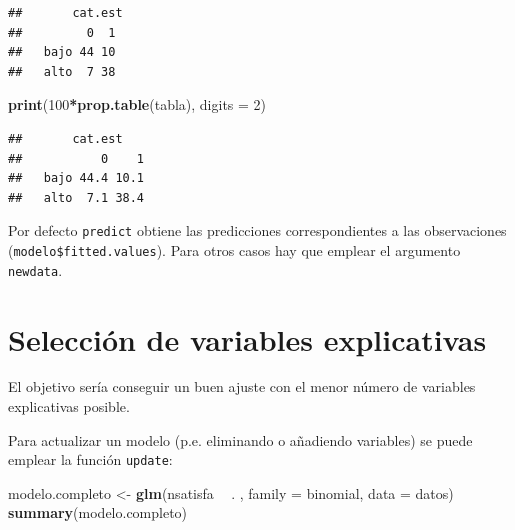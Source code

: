 \documentclass[]{book}
\newenvironment{Shaded}{\begin{snugshade}}{\end{snugshade}}
\newcommand{\KeywordTok}[1]{\textcolor[rgb]{0.13,0.29,0.53}{\textbf{#1}}}
\newcommand{\DataTypeTok}[1]{\textcolor[rgb]{0.13,0.29,0.53}{#1}}
\newcommand{\DecValTok}[1]{\textcolor[rgb]{0.00,0.00,0.81}{#1}}
\newcommand{\FloatTok}[1]{\textcolor[rgb]{0.00,0.00,0.81}{#1}}
\newcommand{\StringTok}[1]{\textcolor[rgb]{0.31,0.60,0.02}{#1}}
\newcommand{\OperatorTok}[1]{\textcolor[rgb]{0.81,0.36,0.00}{\textbf{#1}}}
\newcommand{\NormalTok}[1]{#1}
\begin{document}
\begin{Shaded}
\end{Shaded}

\begin{verbatim}
##       cat.est
##         0  1
##   bajo 44 10
##   alto  7 38
\end{verbatim}

\begin{Shaded}
\begin{Highlighting}[]
\KeywordTok{print}\NormalTok{(}\DecValTok{100}\OperatorTok{*}\KeywordTok{prop.table}\NormalTok{(tabla), }\DataTypeTok{digits =} \DecValTok{2}\NormalTok{)}
\end{Highlighting}
\end{Shaded}

\begin{verbatim}
##       cat.est
##           0    1
##   bajo 44.4 10.1
##   alto  7.1 38.4
\end{verbatim}

Por defecto \texttt{predict} obtiene las predicciones correspondientes a
las observaciones (\texttt{modelo\$fitted.values}). Para otros casos hay
que emplear el argumento \texttt{newdata}.

\section{Selección de variables
explicativas}\label{seleccion-de-variables-explicativas-1}

El objetivo sería conseguir un buen ajuste con el menor número de
variables explicativas posible.

Para actualizar un modelo (p.e. eliminando o añadiendo variables) se
puede emplear la función \texttt{update}:

\begin{Shaded}
\begin{Highlighting}[]
\NormalTok{modelo.completo <-}\StringTok{ }\KeywordTok{glm}\NormalTok{(nsatisfa }\OperatorTok{~}\StringTok{ }\NormalTok{. , }\DataTypeTok{family =}\NormalTok{ binomial, }\DataTypeTok{data =}\NormalTok{ datos)}
\KeywordTok{summary}\NormalTok{(modelo.completo)}
\end{Highlighting}
\end{Shaded}
\end{document}
